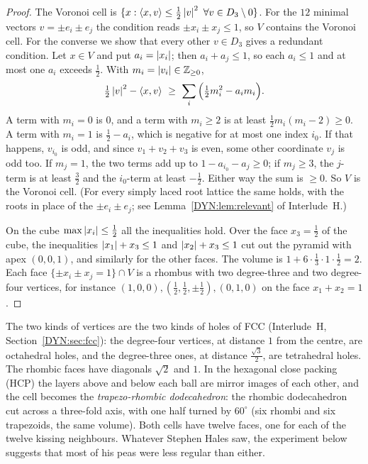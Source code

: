 \begin{proof}
The Voronoi cell is $\{x:\langle x, v\rangle\le\frac12\left\lvert v \right\rvert^2\ \forall v\in D_3\setminus0\}$. For the $12$ minimal
vectors $v=\pm e_i\pm e_j$ the condition reads $\pm x_i\pm x_j\le1$, so $V$ contains the Voronoi cell. For
the converse we show that every other $v\in D_3$ gives a redundant condition. Let $x\in V$ and put
$a_i=\left\lvert x_i \right\rvert$; then $a_i+a_j\le1$, so each $a_i\le1$ and at most one $a_i$ exceeds $\frac12$. With
$m_i=\left\lvert v_i \right\rvert\in\mathbb{Z}_{\ge0}$,
\[
  \tfrac12\abs v^2-\ip xv\ \ge\ \sum_i\Big(\tfrac12m_i^2-a_im_i\Big).
\]
A term with $m_i=0$ is $0$, and a term with $m_i\ge2$ is at least $\frac12m_i(m_i-2)\ge0$. A term with
$m_i=1$ is $\frac12-a_i$, which is negative for at most one index $i_0$. If that happens, $v_{i_0}$ is odd,
and since $v_1+v_2+v_3$ is even, some other coordinate $v_j$ is odd too. If $m_j=1$, the two terms add up
to $1-a_{i_0}-a_j\ge0$; if $m_j\ge3$, the $j$-term is at least $\frac32$ and the $i_0$-term at least
$-\frac12$. Either way the sum is $\ge0$. So $V$ is the Voronoi cell. (For every simply laced root lattice
the same holds, with the roots in place of the $\pm e_i\pm e_j$; see Lemma~\ref{DYN:lem:relevant} of
Interlude~H.)

On the cube $\max\left\lvert x_i \right\rvert\le\frac12$ all the inequalities hold. Over the face $x_3=\frac12$ of the cube,
the inequalities $\left\lvert x_1 \right\rvert+x_3\le1$ and $\left\lvert x_2 \right\rvert+x_3\le1$ cut out the pyramid with apex $(0,0,1)$, and
similarly for the other faces. The volume is $1+6\cdot\frac13\cdot1\cdot\frac12=2$. Each face
$\{\pm x_i\pm x_j=1\}\cap V$ is a rhombus with two degree-three and two degree-four vertices, for instance
$(1,0,0),(\frac12,\frac12,\pm\frac12),(0,1,0)$ on the face $x_1+x_2=1$.
\end{proof}

The two kinds of vertices are the two kinds of holes of FCC (Interlude~H, Section~\ref{DYN:sec:fcc}): the
degree-four vertices, at distance $1$ from the centre, are octahedral holes, and the degree-three ones,
at distance $\frac{\sqrt3}{2}$, are tetrahedral holes. The rhombic faces have diagonals $\sqrt2$ and $1$.
In the hexagonal close packing (HCP) the layers above and below each ball are mirror images of each
other, and the cell becomes the \emph{trapezo-rhombic dodecahedron}: the rhombic dodecahedron cut across a
three-fold axis, with one half turned by $60^\circ$ (six rhombi and six trapezoids, the same volume). Both
cells have twelve faces, one for each of the twelve kissing neighbours. Whatever Stephen Hales saw, the
experiment below suggests that most of his peas were less regular than either.

